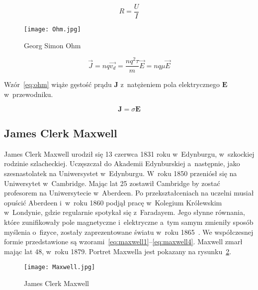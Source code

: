 \begin{equation}
    R = \frac{U}{I}
\end{equation}

\begin{figure}[!h]
	\centering \texttt{[image: Ohm.jpg]}
	\caption{Georg Simon Ohm}
	\label{rys:ohm}
\end{figure}

\begin{equation*}
    \vec{J} = nq \vec{v_d} =  \frac{nq^2 \tau}{m} \vec{E} = nq \mu \vec{E}    
\end{equation*}
 
Wzór~\ref{eq:ohm} wiąże gęstość prądu $\pmb{J}$ z~natężeniem pola elektrycznego $\pmb{E}$ w~przewodniku.
 
\begin{equation}
    \pmb{J} = \sigma \pmb{E}
    \label{eq:ohm}
\end{equation}


\subsection{James Clerk Maxwell}
James Clerk Maxwell urodził się 13 czerwca 1831 roku w~Edynburgu, w~szkockiej rodzinie szlacheckiej. Uczęszczał do Akademii Edynburskiej a~następnie, jako szesnastolatek na Uniwersystet w~Edynburgu. W~roku 1850 przeniósł się na Uniwersytet w~Cambridge. Mając lat 25 zostawił Cambridge by zostać profesorem na Uniwersytecie w~Aberdeen. Po przekształceniach na uczelni musiał opuścić Aberdeen i~w~roku 1860 podjął pracę w~Kolegium Królewskim w~Londynie, gdzie regularnie spotykał się z~Faradayem. Jego słynne równania, które zunifikowały pole magnetyczne i~elektryczne a~tym samym zmieniły sposób myślenia o~fizyce, zostały zaprezentowane światu w~roku 1865~\cite{maxwell1865}. We współczesnej formie przedstawione są wzorami~\ref{eq:maxwell1}--\ref{eq:maxwell4}. Maxwell zmarł mając lat 48, w~roku 1879. Portret Maxwella jest pokazany na rysunku~\ref{rys:maxwell}.

\begin{figure}[!t]
	\centering \texttt{[image: Maxwell.jpg]}
	\caption{James Clerk Maxwell}
	\label{rys:maxwell}
\end{figure}

